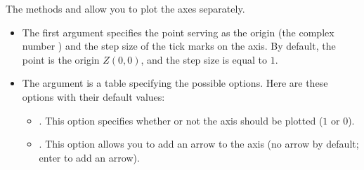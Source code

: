 The methods  and  allow you to plot the axes separately.
\begin{itemize}
    \item The first argument specifies the point serving as the origin (the complex number ) and the step size of the tick marks on the axis. By default, the point  is the origin $Z(0,0)$, and the step size is equal to $1$.
    \item The argument  is a table specifying the possible options. Here are these options with their default values:
    \begin{itemize}
        \item {}. This option specifies whether or not the axis should be plotted ($1$ or $0$).
        \item {}. This option allows you to add an arrow to the axis (no arrow by default; enter  to add an arrow).


\end{itemize}
\end{itemize}

